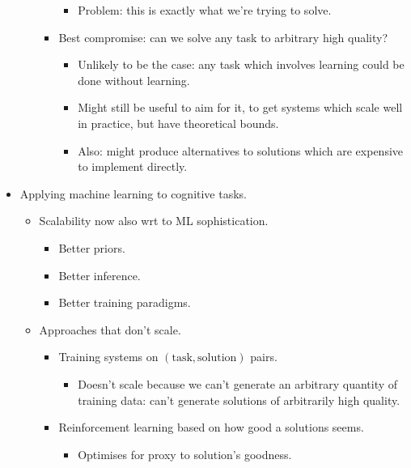 \begin{itemize}
\begin{itemize}
\begin{itemize}
            \begin{itemize}
                \item Problem: this is exactly what we're trying to solve.
            \end{itemize}
            \item Best compromise: can we solve any task to arbitrary high quality?
            \begin{itemize}
                \item Unlikely to be the case: any task which involves learning could be done without learning.
                \item Might still be useful to aim for it, to get systems which scale well in practice, but have theoretical bounds.
                \item Also: might produce alternatives to solutions which are expensive to implement directly.
            \end{itemize}
        \end{itemize}
    \end{itemize}
    \item Applying machine learning to cognitive tasks.
    \begin{itemize}
        \item Scalability now also wrt to ML sophistication.
        \begin{itemize}
            \item Better priors.
            \item Better inference.
            \item Better training paradigms.
        \end{itemize}
        \item Approaches that don't scale.
        \begin{itemize}
            \item Training systems on $(\text{task}, \text{solution})$ pairs.
            \begin{itemize}
                \item Doesn't scale because we can't generate an arbitrary quantity of training data: can't generate solutions of arbitrarily high quality.
            \end{itemize}
            \item Reinforcement learning based on how good a solutions seems.
            \begin{itemize}
                \item Optimises for proxy to solution's goodness.

\end{itemize}
\end{itemize}
\end{itemize}
\end{itemize}
